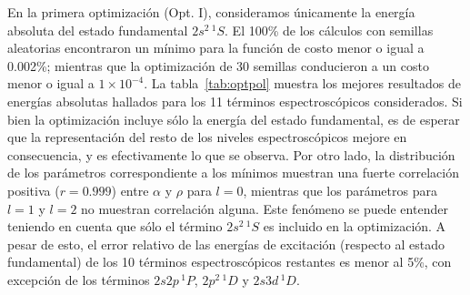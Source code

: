 En la primera optimización (Opt. I), consideramos únicamente la energía
absoluta del estado fundamental $2s^2\,^1S$. El 100\% de los cálculos con
semillas aleatorias encontraron un mínimo para la función de costo menor 
o igual a 0.002\%; mientras que la optimización de 30 semillas 
conducieron a un costo menor o igual a $1\times 10^{-4}$. La 
tabla~\ref{tab:optpol} muestra los mejores resultados de energías 
absolutas hallados para los 11 términos espectroscópicos considerados. 
Si bien la optimización incluye sólo la energía del estado fundamental, 
es de esperar que la representación del resto de los niveles 
espectroscópicos mejore en consecuencia, y es efectivamente lo que se 
observa. Por otro lado, la distribución de los parámetros correspondiente 
a los mínimos muestran una fuerte correlación positiva ($r=0.999$) entre 
$\alpha$ y $\rho$ para $l=0$, mientras que los parámetros para $l=1$ y 
$l=2$ no muestran correlación alguna. Este fenómeno se puede entender 
teniendo en cuenta que sólo el término $2s^2\,^1S$ es incluido en la 
optimización. A pesar de esto, el error relativo de las energías de 
excitación (respecto al estado fundamental) de los 10 términos 
espectroscópicos restantes es menor al 5\%, con excepción de los 
términos $2s2p\,^1P$, $2p^2\,^1D$ y $2s3d\,^1D$.

